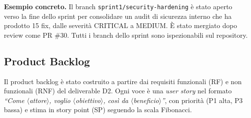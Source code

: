 \documentclass[11pt,a4paper]{article}
\newcommand{\code}[1]{\texttt{\small#1}}
\begin{document}
  \begin{tcolorbox}[callout]
  \textbf{Esempio concreto.} Il branch \code{sprint1/security-hardening} \`{e} stato aperto
  verso la fine dello sprint per consolidare un audit di sicurezza interno che ha prodotto
  15 fix, dalle severit\`{a} CRITICAL a MEDIUM. \`{E} stato mergiato dopo review come PR \#30.
  Tutti i branch dello sprint sono ispezionabili sul repository.
  \end{tcolorbox}

  \subsection{Product Backlog}
  Il product backlog \`{e} stato costruito a partire dai requisiti funzionali (RF) e non
  funzionali (RNF) del deliverable D2. Ogni voce \`{e} una \emph{user story} nel formato
  \emph{``Come $\langle$attore$\rangle$, voglio $\langle$obiettivo$\rangle$, cos\`{i} da
  $\langle$beneficio$\rangle$''}, con priorit\`{a} (P1 alta, P3 bassa) e stima in story point
  (SP) seguendo la scala Fibonacci.
\end{document}
